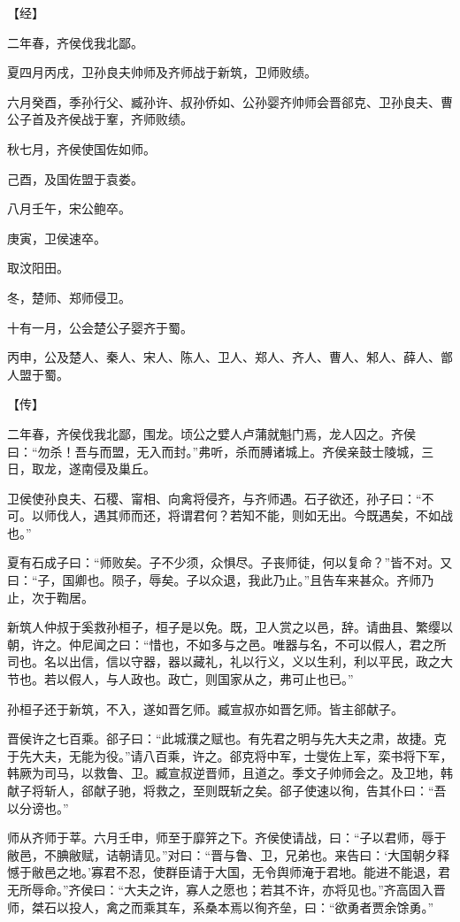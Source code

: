\documentclass[a4paper,12pt,UTF8,twoside]{ctexbook}
\begin{document}
【经】

二年春，齐侯伐我北鄙。

夏四月丙戌，卫孙良夫帅师及齐师战于新筑，卫师败绩。

六月癸酉，季孙行父、臧孙许、叔孙侨如、公孙婴齐帅师会晋郤克、卫孙良夫、曹公子首及齐侯战于鞌，齐师败绩。

秋七月，齐侯使国佐如师。

己酉，及国佐盟于袁娄。

八月壬午，宋公鲍卒。

庚寅，卫侯速卒。

取汶阳田。

冬，楚师、郑师侵卫。

十有一月，公会楚公子婴齐于蜀。

丙申，公及楚人、秦人、宋人、陈人、卫人、郑人、齐人、曹人、邾人、薛人、鄫人盟于蜀。

【传】

二年春，齐侯伐我北鄙，围龙。顷公之嬖人卢蒲就魁门焉，龙人囚之。齐侯曰：“勿杀！吾与而盟，无入而封。”弗听，杀而膊诸城上。齐侯亲鼓士陵城，三日，取龙，遂南侵及巢丘。

卫侯使孙良夫、石稷、甯相、向禽将侵齐，与齐师遇。石子欲还，孙子曰：“不可。以师伐人，遇其师而还，将谓君何？若知不能，则如无出。今既遇矣，不如战也。”

夏有石成子曰：“师败矣。子不少须，众惧尽。子丧师徒，何以复命？”皆不对。又曰：“子，国卿也。陨子，辱矣。子以众退，我此乃止。”且告车来甚众。齐师乃止，次于鞫居。

新筑人仲叔于奚救孙桓子，桓子是以免。既，卫人赏之以邑，辞。请曲县、繁缨以朝，许之。仲尼闻之曰：“惜也，不如多与之邑。唯器与名，不可以假人，君之所司也。名以出信，信以守器，器以藏礼，礼以行义，义以生利，利以平民，政之大节也。若以假人，与人政也。政亡，则国家从之，弗可止也已。”

孙桓子还于新筑，不入，遂如晋乞师。臧宣叔亦如晋乞师。皆主郤献子。

晋侯许之七百乘。郤子曰：“此城濮之赋也。有先君之明与先大夫之肃，故捷。克于先大夫，无能为役。”请八百乘，许之。郤克将中军，士燮佐上军，栾书将下军，韩厥为司马，以救鲁、卫。臧宣叔逆晋师，且道之。季文子帅师会之。及卫地，韩献子将斩人，郤献子驰，将救之，至则既斩之矣。郤子使速以徇，告其仆曰：“吾以分谤也。”

师从齐师于莘。六月壬申，师至于靡笄之下。齐侯使请战，曰：“子以君师，辱于敝邑，不腆敝赋，诘朝请见。”对曰：“晋与鲁、卫，兄弟也。来告曰：‘大国朝夕释憾于敝邑之地。’寡君不忍，使群臣请于大国，无令舆师淹于君地。能进不能退，君无所辱命。”齐侯曰：“大夫之许，寡人之愿也；若其不许，亦将见也。”齐高固入晋师，桀石以投人，禽之而乘其车，系桑本焉以徇齐垒，曰：“欲勇者贾余馀勇。”
\end{document}
